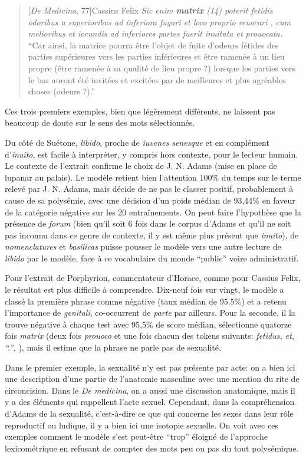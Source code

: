 \begin{quote}[\textit{De Medicina}, 77]{Cassius Felix}
    \textit{Sic enim \textbf{matrix} (14) poterit fetidis odoribus a superioribus ad inferiora fugari et loco proprio reuocari , cum melioribus et iocundis ad inferiores partes fuerit inuitata et prouocata.} \\
    \enquote{Car ainsi, la matrice pourra être l'objet de fuite d'odeurs fétides des parties supérieures vers les parties inférieures et être ramenée à un lieu propre (être ramenée à sa qualité de lieu propre ?) lorsque les parties vers le bas auront été invitées et excitées par de meilleures et plus agréables choses (odeurs ?).}
\end{quote}

Ces trois premiers exemples, bien que légèrement différents, ne laissent pas beaucoup de doute sur le sens des mots sélectionnés. 

Du côté de Suétone, \textit{libido}, proche de \textit{iuvenes senesque} et en complément d'\textit{inuito}, est facile à interpréter, y compris hors contexte, pour le lecteur humain. Le contexte de l'extrait confirme le choix de J. N. Adams (mise en place de lupanar au palais). Le modèle retient bien l'attention 100\% du temps sur le terme relevé par J. N. Adams, mais décide de ne pas le classer positif, probablement à cause de sa polysémie, avec une décision d'un poids médian de 93,44\% en faveur de la catégorie négative sur les 20 entraînements. On peut faire l'hypothèse que la présence de \textit{forum} (bien qu'il soit 6 fois dans le corpus d'Adams et qu'il ne soit pas inconnu dans ce genre de contexte, il y est même plus présent que \textit{inuito}), de \textit{nomenclatures} et \textit{basilicas} puisse pousser le modèle vers une autre lecture de \textit{libido} par le modèle, face à ce vocabulaire du monde ``public'' voire administratif.

Pour l'extrait de Porphyrion, commentateur d'Horace, comme pour Cassius Felix, le résultat est plus difficile à comprendre. Dix-neuf fois sur vingt, le modèle a classé la première phrase comme négative  (taux médian de 95.5\%) et a retenu l'importance de \textit{genitali}, co-occurrent de \textit{parte} par ailleurs. Pour la seconde, il la trouve négative à chaque test avec 95,5\% de score médian, sélectionne quatorze fois \textit{matrix} (deux fois \textit{prouoco} et une fois chacun des tokens suivants: \textit{fetidus, et, ``.'', }), mais il estime que la phrase ne parle pas de sexualité.

Dans le premier exemple, la sexualité n'y est pas présente par acte: on a bien ici une description d'une partie de l'anatomie masculine avec une mention du rite de circoncision. Dans le \textit{De medicina}, on a aussi une discussion anatomique, mais il y a des éléments qui rappellent l'acte sexuel. Cependant, dans la compréhension d'Adams de la sexualité, c'est-à-dire ce que qui concerne les sexes dans leur rôle reproductif ou ludique, il y a bien ici une isotopie sexuelle. On voit avec ces exemples comment le modèle s'est peut-être ``trop'' éloigné de l'approche lexicométrique en refusant de compter des mots peu ou pas du tout polysémique.

